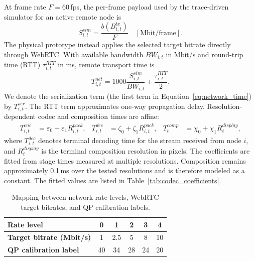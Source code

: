 \documentclass[acmsmall]{acmart}
\begin{document}
	At frame rate $F=60$\,fps, the per-frame payload used by the trace-driven simulator for an active remote node is
	\begin{equation}
		S^{sim}_{i,t}=\frac{b(B^{tx}_{i,t})}{F}
		\quad[\mathrm{Mbit/frame}].
		\label{eq:payload}
	\end{equation}
	The physical prototype instead applies the selected target bitrate directly through WebRTC.
	With available bandwidth $BW_{i,t}$ in Mbit/s and round-trip time (RTT) $\tau^{RTT}_{i,t}$ in ms,
	remote transport time is
	\begin{equation}
		T^{net}_{i,t}=1000\frac{S^{sim}_{i,t}}{BW_{i,t}}+\frac{\tau^{RTT}_{i,t}}{2}.
		\label{eq:network_time}
	\end{equation}
	We denote the serialization term (the first term in Equation~\ref{eq:network_time}) by
	$T^{ser}_{i,t}$. The RTT term approximates one-way propagation delay.
	Resolution-dependent codec and composition times are affine:
	\begin{align}
		T^{enc}_{i,t}&=\varepsilon_0+\varepsilon_1R^{pack}_{i,t}, &
		T^{dec}_{i,t}&=\zeta_0+\zeta_1R^{pack}_{i,t}, &
		T^{comp}_{t}&=\chi_0+\chi_1R^{display}_{t},
		\label{eq:codec_comp_time}
	\end{align}
	where $T^{dec}_{i,t}$ denotes terminal decoding time for the stream received from node $i$, and $R^{display}_{t}$ is the terminal composition resolution in pixels. The coefficients are
	fitted from stage times measured at multiple resolutions. Composition remains approximately
	0.1\,ms over the tested resolutions and is therefore modeled as a constant. The fitted values are
	listed in Table~\ref{tab:codec_coefficients}.

	\begin{table}[tbp]
		\centering
		\caption{Mapping between network rate levels, WebRTC target bitrates, and QP calibration labels.}
		\label{tab:qp_rate_map}
		\scriptsize
		\renewcommand{\arraystretch}{1.05}
		\begin{tabular}{lccccc}
			\toprule
			\textbf{Rate level} & 0 & 1 & 2 & 3 & 4 \\
			\midrule
			\textbf{Target bitrate (Mbit/s)} & 1 & 2.5 & 5 & 8 & 10 \\
			\textbf{QP calibration label} & 40 & 34 & 28 & 24 & 20 \\
			\bottomrule
		\end{tabular}
	\end{table}
\end{document}
